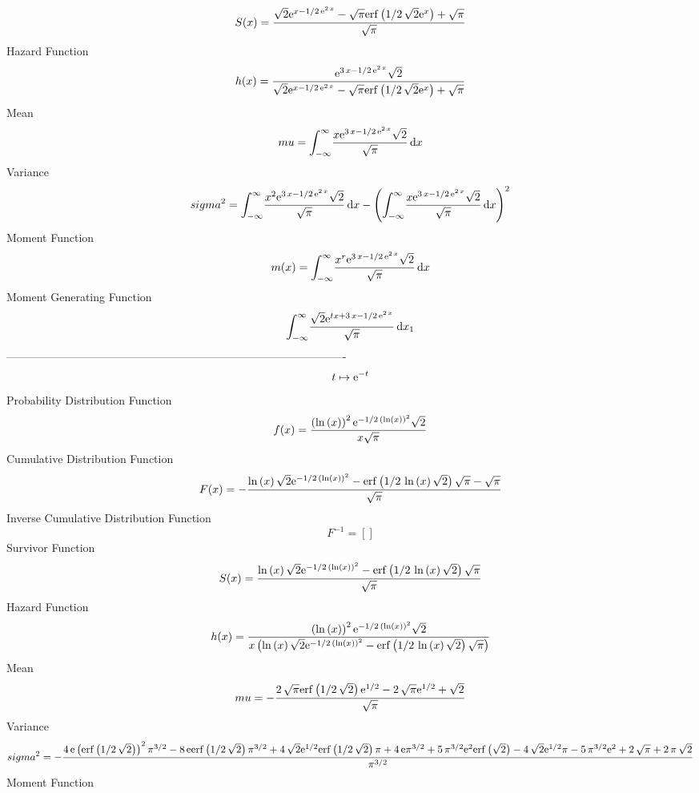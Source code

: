 \documentclass[12pt]{article}
\begin{document}
 $$ S(x)={\frac {\sqrt {2}{{\rm e}^{x-1/2\,{{\rm e}^{2\,x}}}}-\sqrt {\pi}
{\rm erf} \left(1/2\,\sqrt {2}{{\rm e}^{x}}\right)+\sqrt {\pi}}{\sqrt 
{\pi}}}
$$ Hazard Function 
 $$ h(x)={\frac {{{\rm e}^{3\,x-1/2\,{{\rm e}^{2\,x}}}}\sqrt {2}}{\sqrt {2}{
{\rm e}^{x-1/2\,{{\rm e}^{2\,x}}}}-\sqrt {\pi}{\rm erf} \left(1/2\,
\sqrt {2}{{\rm e}^{x}}\right)+\sqrt {\pi}}}
$$Mean 
 $$ mu=\int_{-\infty }^{\infty }\!{\frac {x{{\rm e}^{3\,x-1/2\,{{\rm e}^{2\,x
}}}}\sqrt {2}}{\sqrt {\pi}}}\,{\rm d}x
$$ Variance 
 $$ sigma^2 = \int_{-\infty }^{\infty }\!{\frac {{x}^{2}{{\rm e}^{3\,x-1/2\,{{\rm e}
^{2\,x}}}}\sqrt {2}}{\sqrt {\pi}}}\,{\rm d}x- \left( \int_{-\infty }^{
\infty }\!{\frac {x{{\rm e}^{3\,x-1/2\,{{\rm e}^{2\,x}}}}\sqrt {2}}{
\sqrt {\pi}}}\,{\rm d}x \right) ^{2}
$$Moment Function 
 $$ m(x) = \int_{-\infty }^{\infty }\!{\frac {{x}^{r}{{\rm e}^{3\,x-1/2\,{{\rm e}
^{2\,x}}}}\sqrt {2}}{\sqrt {\pi}}}\,{\rm d}x
$$ Moment Generating Function 
 $$\int_{-\infty }^{\infty }\!{\frac {\sqrt {2}{{\rm e}^{tx+3\,x-1/2\,{
{\rm e}^{2\,x}}}}}{\sqrt {\pi}}}\,{\rm d}x_{{1}}
$$-------------------------------------------------------------------------------------------  \\$$t\mapsto {{\rm e}^{-t}}
$$Probability Distribution Function 
$$  f(x)={\frac { \left( \ln  \left( x \right)  \right) ^{2}{{\rm e}^{-1/2\,
 \left( \ln  \left( x \right)  \right) ^{2}}}\sqrt {2}}{x\sqrt {\pi}}}
$$Cumulative Distribution Function  
 $$F(x)=-{\frac {\ln  \left( x \right) \sqrt {2}{{\rm e}^{-1/2\, \left( \ln 
 \left( x \right)  \right) ^{2}}}-{\rm erf} \left(1/2\,\ln  \left( x
 \right) \sqrt {2}\right)\sqrt {\pi}-\sqrt {\pi}}{\sqrt {\pi}}}
$$ Inverse Cumulative Distribution Function 
  $$F^{-1} = []
$$Survivor Function 
 $$ S(x)={\frac {\ln  \left( x \right) \sqrt {2}{{\rm e}^{-1/2\, \left( \ln 
 \left( x \right)  \right) ^{2}}}-{\rm erf} \left(1/2\,\ln  \left( x
 \right) \sqrt {2}\right)\sqrt {\pi}}{\sqrt {\pi}}}
$$ Hazard Function 
 $$ h(x)={\frac { \left( \ln  \left( x \right)  \right) ^{2}{{\rm e}^{-1/2\,
 \left( \ln  \left( x \right)  \right) ^{2}}}\sqrt {2}}{x \left( \ln 
 \left( x \right) \sqrt {2}{{\rm e}^{-1/2\, \left( \ln  \left( x
 \right)  \right) ^{2}}}-{\rm erf} \left(1/2\,\ln  \left( x \right) 
\sqrt {2}\right)\sqrt {\pi} \right) }}
$$Mean 
 $$ mu=-{\frac {2\,\sqrt {\pi}{\rm erf} \left(1/2\,\sqrt {2}\right){{\rm e}^{
1/2}}-2\,\sqrt {\pi}{{\rm e}^{1/2}}+\sqrt {2}}{\sqrt {\pi}}}
$$ Variance 
 $$ sigma^2 = -{\frac {4\,{\rm e} \left( {\rm erf} \left(1/2\,\sqrt {2}\right)
 \right) ^{2}{\pi}^{3/2}-8\,{\rm e}{\rm erf} \left(1/2\,\sqrt {2}
\right){\pi}^{3/2}+4\,\sqrt {2}{{\rm e}^{1/2}}{\rm erf} \left(1/2\,
\sqrt {2}\right)\pi+4\,{\rm e}{\pi}^{3/2}+5\,{\pi}^{3/2}{{\rm e}^{2}}
{\rm erf} \left(\sqrt {2}\right)-4\,\sqrt {2}{{\rm e}^{1/2}}\pi-5\,{
\pi}^{3/2}{{\rm e}^{2}}+2\,\sqrt {\pi}+2\,\pi\,\sqrt {2}}{{\pi}^{3/2}}
}
$$Moment Function 
\end{document}
